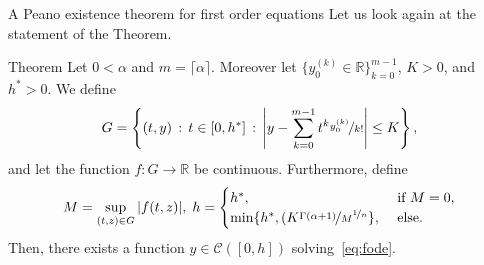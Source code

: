 \documentclass[aspectratio=169,xcolor=dvipsnames]{beamer}
\begin{document}
\begin{frame}{A Peano existence theorem for first order equations}
Let us look again at the statement of the Theorem.
\begin{alertblock}{Theorem \parencite[Theorem 2.1,2.2]{DiethelmFord}}
	Let $0 < \alpha$  and $m = \lceil \alpha \rceil$. Moreover let $\{ y_0^{(k)} \in \mathbb{R} \}_{k=0}^{m-1}$, $K > 0$, and $h^* > 0$. We define
	\[
	G = \left\lbrace (t,y) \,:\, t \in [0,h^*] \,:\, \left| y - \sum_{k=0}^{m-1} t^k \nicefrac{y_0^{(k)}}{k!} \right| \leq K  \right\rbrace,
	\]
	and let the function $f: G \rightarrow \mathbb{R}$ be continuous. Furthermore, define
	\[
	M = \sup_{(t,z) \in G} |f(t,z)|, \; h = \begin{cases}
	h^*, & \text{ if }M=0,\\
	\min \{ h^*, (K \nicefrac{\Gamma(\alpha+1)}{M}^{\nicefrac{1}{n}} \}, & \text{ else.}
	\end{cases}
	\]
	Then, there exists a function $y \in \mathcal{C}([0,h])$ solving~\eqref{eq:fode}.
\end{alertblock}
\end{frame}
\end{document}
